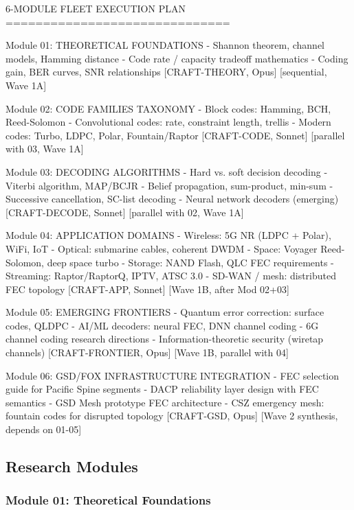 \documentclass[11pt,letterpaper]{article}
\begin{document}
\begin{asciibox}
6-MODULE FLEET EXECUTION PLAN
==============================

Module 01: THEORETICAL FOUNDATIONS
  - Shannon theorem, channel models, Hamming distance
  - Code rate / capacity tradeoff mathematics
  - Coding gain, BER curves, SNR relationships
  [CRAFT-THEORY, Opus] [sequential, Wave 1A]

Module 02: CODE FAMILIES TAXONOMY
  - Block codes: Hamming, BCH, Reed-Solomon
  - Convolutional codes: rate, constraint length, trellis
  - Modern codes: Turbo, LDPC, Polar, Fountain/Raptor
  [CRAFT-CODE, Sonnet] [parallel with 03, Wave 1A]

Module 03: DECODING ALGORITHMS
  - Hard vs. soft decision decoding
  - Viterbi algorithm, MAP/BCJR
  - Belief propagation, sum-product, min-sum
  - Successive cancellation, SC-list decoding
  - Neural network decoders (emerging)
  [CRAFT-DECODE, Sonnet] [parallel with 02, Wave 1A]

Module 04: APPLICATION DOMAINS
  - Wireless: 5G NR (LDPC + Polar), WiFi, IoT
  - Optical: submarine cables, coherent DWDM
  - Space: Voyager Reed-Solomon, deep space turbo
  - Storage: NAND Flash, QLC FEC requirements
  - Streaming: Raptor/RaptorQ, IPTV, ATSC 3.0
  - SD-WAN / mesh: distributed FEC topology
  [CRAFT-APP, Sonnet] [Wave 1B, after Mod 02+03]

Module 05: EMERGING FRONTIERS
  - Quantum error correction: surface codes, QLDPC
  - AI/ML decoders: neural FEC, DNN channel coding
  - 6G channel coding research directions
  - Information-theoretic security (wiretap channels)
  [CRAFT-FRONTIER, Opus] [Wave 1B, parallel with 04]

Module 06: GSD/FOX INFRASTRUCTURE INTEGRATION
  - FEC selection guide for Pacific Spine segments
  - DACP reliability layer design with FEC semantics
  - GSD Mesh prototype FEC architecture
  - CSZ emergency mesh: fountain codes for disrupted topology
  [CRAFT-GSD, Opus] [Wave 2 synthesis, depends on 01-05]
\end{asciibox}

\subsection{Research Modules}

\subsubsection{Module 01: Theoretical Foundations}
\end{document}
